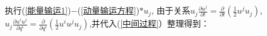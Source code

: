\documentclass[LBMDerivation.tex]{subfiles}
\begin{document}


%


执行(\ref{能量输运1})$-$(\ref{动量输运方程})$*u_j$, 由于关系$u_j\frac{\partial u^j}{\partial t}=\frac{\partial}{\partial t}( \frac{1}{2}u^ju_j)$,$u_j\frac{\partial u^i u^j}{\partial q^i}=\frac{\partial}{\partial q^i}( \frac{1}{2}u^i u^ju_j)$,并代入(\ref{中间过程}）整理得到：







\end{document}
